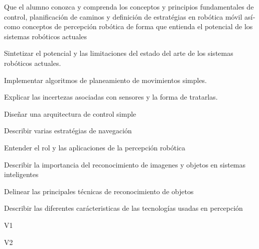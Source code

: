 \begin{syllabus}


\begin{justification}
Que el alumno conozca y comprenda los conceptos y principios fundamentales de control, planificación de caminos y
definición de estratégias en robótica móvil así­ como conceptos de percepción robótica de forma que entienda el potencial
de los sistemas robóticos actuales
\end{justification}

\begin{goals}
\item Sintetizar el potencial y las limitaciones del estado del arte de los sistemas robóticos actuales.
\item Implementar algoritmos de planeamiento de movimientos simples.
\item Explicar las incertezas asociadas con sensores y la forma de tratarlas.
\item Diseñar una arquitectura de control simple
\item Describir varias estratégias de navegación
\item Entender el rol y las aplicaciones de la percepción robótica
\item Describir la importancia del reconocimiento de imagenes y objetos en sistemas inteligentes
\item Delinear las principales técnicas de reconocimiento de objetos
\item Describir las diferentes carácteristicas de las tecnologías usadas en percepción
\end{goals}

\begin{outcomes}{V1}
    \item {}
    \item {}
    \item {}
    \item {}
    \item {}
\end{outcomes}

\begin{outcomes}{V2}
    \item {}
    \item {}
    \item {}
    \item {}
\end{outcomes}


\end{syllabus}
